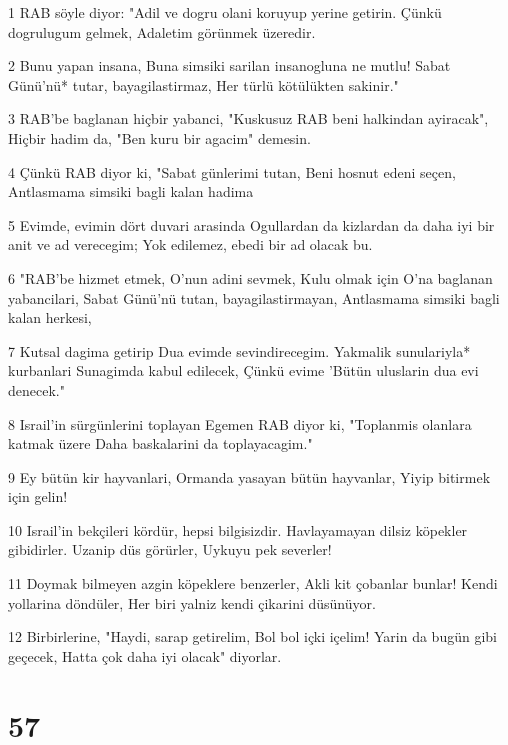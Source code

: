 \par 1 RAB söyle diyor: "Adil ve dogru olani koruyup yerine getirin. Çünkü dogrulugum gelmek, Adaletim görünmek üzeredir.
\par 2 Bunu yapan insana, Buna simsiki sarilan insanogluna ne mutlu! Sabat Günü'nü* tutar, bayagilastirmaz, Her türlü kötülükten sakinir."
\par 3 RAB'be baglanan hiçbir yabanci, "Kuskusuz RAB beni halkindan ayiracak", Hiçbir hadim da, "Ben kuru bir agacim" demesin.
\par 4 Çünkü RAB diyor ki, "Sabat günlerimi tutan, Beni hosnut edeni seçen, Antlasmama simsiki bagli kalan hadima
\par 5 Evimde, evimin dört duvari arasinda Ogullardan da kizlardan da daha iyi bir anit ve ad verecegim; Yok edilemez, ebedi bir ad olacak bu.
\par 6 "RAB'be hizmet etmek, O'nun adini sevmek, Kulu olmak için O'na baglanan yabancilari, Sabat Günü'nü tutan, bayagilastirmayan, Antlasmama simsiki bagli kalan herkesi,
\par 7 Kutsal dagima getirip Dua evimde sevindirecegim. Yakmalik sunulariyla* kurbanlari Sunagimda kabul edilecek, Çünkü evime 'Bütün uluslarin dua evi denecek."
\par 8 Israil'in sürgünlerini toplayan Egemen RAB diyor ki, "Toplanmis olanlara katmak üzere Daha baskalarini da toplayacagim."
\par 9 Ey bütün kir hayvanlari, Ormanda yasayan bütün hayvanlar, Yiyip bitirmek için gelin!
\par 10 Israil'in bekçileri kördür, hepsi bilgisizdir. Havlayamayan dilsiz köpekler gibidirler. Uzanip düs görürler, Uykuyu pek severler!
\par 11 Doymak bilmeyen azgin köpeklere benzerler, Akli kit çobanlar bunlar! Kendi yollarina döndüler, Her biri yalniz kendi çikarini düsünüyor.
\par 12 Birbirlerine, "Haydi, sarap getirelim, Bol bol içki içelim! Yarin da bugün gibi geçecek, Hatta çok daha iyi olacak" diyorlar.

\chapter{57}

